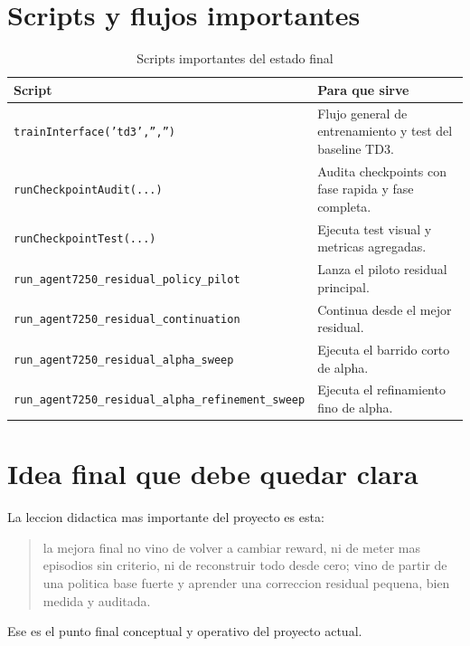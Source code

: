 \documentclass[11pt,a4paper]{article}
\begin{document}
\section{Scripts y flujos importantes}

\begin{table}[H]
\centering
\caption{Scripts importantes del estado final}
\begin{tabularx}{\linewidth}{L{5.5cm}Y}
\toprule
Script & Para que sirve \\
\midrule
\texttt{trainInterface('td3','','')} & Flujo general de entrenamiento y test del baseline TD3. \\
\texttt{runCheckpointAudit(...)} & Audita checkpoints con fase rapida y fase completa. \\
\texttt{runCheckpointTest(...)} & Ejecuta test visual y metricas agregadas. \\
\texttt{run\_agent7250\_residual\_policy\_pilot} & Lanza el piloto residual principal. \\
\texttt{run\_agent7250\_residual\_continuation} & Continua desde el mejor residual. \\
\texttt{run\_agent7250\_residual\_alpha\_sweep} & Ejecuta el barrido corto de alpha. \\
\texttt{run\_agent7250\_residual\_alpha\_refinement\_sweep} & Ejecuta el refinamiento fino de alpha. \\
\bottomrule
\end{tabularx}
\end{table}

\section{Idea final que debe quedar clara}

La leccion didactica mas importante del proyecto es esta:

\begin{quote}
la mejora final no vino de volver a cambiar reward, ni de meter mas episodios sin criterio, ni de reconstruir todo desde cero; vino de partir de una politica base fuerte y aprender una correccion residual pequena, bien medida y auditada.
\end{quote}

Ese es el punto final conceptual y operativo del proyecto actual.



\end{document}
